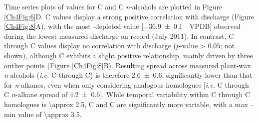 Time series plots of  values for C and C \textit{n}-alcohols are plotted in Figure \ref{Ch4Fig:6}D. C  values display a strong positive correlation with discharge (Figure \ref{Ch4Fig:8}A), with the most -depleted value [\SI{-36.9 \pm 0.1}{\permil.VPDB}] observed during the lowest measured discharge on record (July 2011). In contrast, C through C  values display no correlation with discharge ($p$-value > $0.05$; not shown), although C exhibits a slight positive relationship, mainly driven by three outlier points (Figure \ref{Ch4Fig:8}B). Resulting  spread across measured plant-wax \textit{n}-alcohols (\textit{i.e.} C through C) is therefore \SI{2.6 \pm 0.6}{\permil}, significantly lower than that for \textit{n}-alkanes, even when only considering analogous homologues [\textit{i.e.} C through C \textit{n}-alkane spread of \SI{4.2 \pm 0.6}{\permil}]. While temporal variability within C through C homologues is \SI{\approx 2.5}{\permil}, C and C are significantly more variable, with a max -- min value of \SI{\approx 3.5}{\permil}. 

